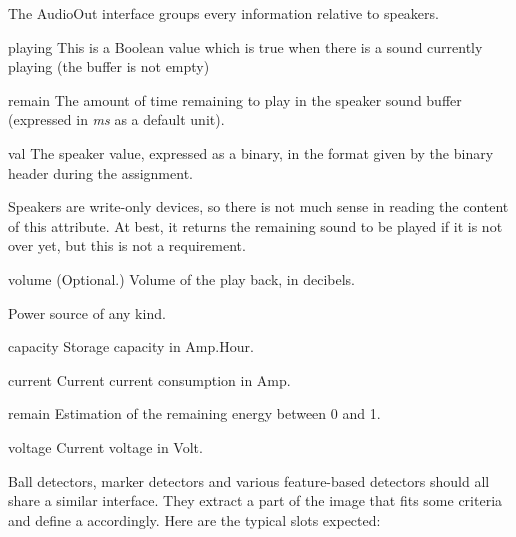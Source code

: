 The AudioOut interface groups every information relative to speakers.

\begin{urbiscriptapi}
\item[playing] This is a Boolean value which is true when there is a sound
  currently playing (the buffer is not empty)%


\item[remain] The amount of time remaining to play in the speaker sound
  buffer (expressed in \textit{ms} as a default unit).


\item[val] The speaker value, expressed as a binary, in the format given by
  the binary header during the assignment.

  Speakers are write-only devices, so there is not much sense in reading the
  content of this attribute. At best, it returns the remaining sound to be
  played if it is not over yet, but this is not a requirement.


\item[volume]{} (Optional.) Volume of the play back, in decibels.
\end{urbiscriptapi}



Power source of any kind.
\begin{urbiscriptapi}
\item[capacity] Storage capacity in Amp.Hour.


\item[current] Current current consumption in Amp.


\item[remain] Estimation of the remaining energy between 0 and 1.


\item[voltage] Current voltage in Volt.
\end{urbiscriptapi}



Ball detectors, marker detectors and various feature-based detectors
should all share a similar interface. They extract a part of the image
that fits some criteria and define a  accordingly. Here are
the typical slots expected:

